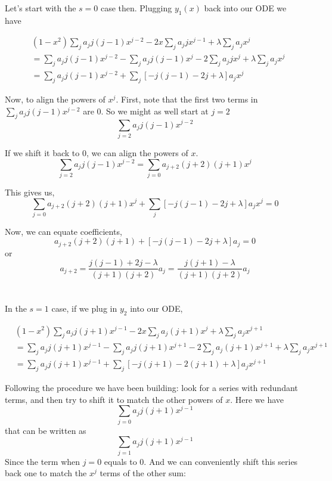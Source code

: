 Let's start with the $s=0$ case then.
Plugging $y_1 (x)$ back into our ODE we have

\begin{align*}
& (1-x^2) \sum_j a_j j(j-1) x^{j-2}
    - 2x \sum_j a_j j x^{j-1}
    + \lambda \sum_j a_j x^j \\
&= \sum_j a_j j(j-1) x^{j-2}
    - \sum_j a_j j(j-1) x^{j}
    - 2 \sum_j a_j j x^{j}
    + \lambda \sum_j a_j x^j \\
&= \sum_j a_j j(j-1) x^{j-2}
    + \sum_j \left[ -j(j-1) -2j + \lambda \right] a_j x^j
\end{align*}

Now, to align the powers of $x^{j}$.
First, note that the first two terms in
$\sum_j a_j j(j-1) x^{j-2}$ are $0$.
So we might as well start at $j=2$
$$
\sum_{j=2} a_j j(j-1) x^{j-2}
$$

If we shift it back to $0$, we can align the powers of $x$.
$$
\sum_{j=2} a_j j(j-1) x^{j-2} =
\sum_{j=0} a_{j+2} (j+2)(j+1) x^{j}
$$

This gives us,
$$
\sum_{j=0} a_{j+2} (j+2)(j+1) x^{j}
+ \sum_j \left[ -j(j-1) -2j + \lambda \right] a_j x^j
= 0
$$

Now, we can equate coefficients,
$$
a_{j+2} (j+2)(j+1)
    + \left[ -j(j-1) -2j + \lambda \right] a_j = 0
$$
or
$$
a_{j+2} = \frac{ j(j-1) + 2j - \lambda }{ (j+1)(j+2) } a_j
= \frac{ j(j+1) - \lambda  }{ (j+1)(j+2) } a_j
$$
\\~\\

In the $s=1$ case, if we plug in $y_2$ into our ODE,

\begin{align*}
& (1-x^2) \sum_j a_j j(j+1) x^{j-1}
    - 2x \sum_j a_j (j+1) x^{j}
    + \lambda \sum_j a_j x^{j+1} \\
&= \sum_j a_j j(j+1) x^{j-1}
    - \sum_j a_j j(j+1) x^{j+1}
    - 2 \sum_j a_j (j+1) x^{j+1}
    + \lambda \sum_j a_j x^{j+1} \\
&= \sum_j a_j j(j+1) x^{j-1}
    + \sum_j \left[ -j(j+1) -2(j+1) + \lambda \right] a_j x^{j+1}
\end{align*}

Following the procedure we have been building: look for a series with redundant terms, and then try to shift it to match
the other powers of $x$.
Here we have
$$
\sum_{j=0} a_j j(j+1) x^{j-1}
$$
that can be written as
$$
\sum_{j=1} a_j j(j+1) x^{j-1}
$$
Since the term when $j=0$ equals to 0.
And we can conveniently shift this series back one to match the $x^j$ terms of the other sum:

